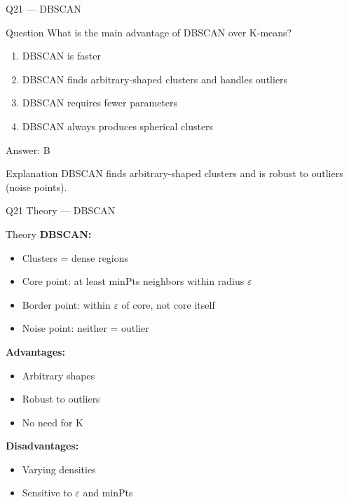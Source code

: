 \documentclass[aspectratio=169,8pt]{beamer}
\begin{document}
	\begin{frame}{Q21 --- DBSCAN}
		\begin{block}{Question}
			What is the main advantage of DBSCAN over K-means?
		\end{block}
		\begin{enumerate}[label=\Alph*.]
			\item DBSCAN is faster
			\item DBSCAN finds arbitrary-shaped clusters and handles outliers
			\item DBSCAN requires fewer parameters
			\item DBSCAN always produces spherical clusters
		\end{enumerate}
		\begin{exampleblock}{Answer: B}
		\end{exampleblock}
		\begin{block}{Explanation}
			DBSCAN finds arbitrary-shaped clusters and is robust to outliers (noise points).
		\end{block}
	\end{frame}
	
	\begin{frame}{Q21 Theory --- DBSCAN}
		\begin{block}{Theory}
			\textbf{DBSCAN:}
			\begin{itemize}
				\item Clusters = dense regions
				\item Core point: at least minPts neighbors within radius $\varepsilon$
				\item Border point: within $\varepsilon$ of core, not core itself
				\item Noise point: neither = outlier
			\end{itemize}
			\textbf{Advantages:}
			\begin{itemize}
				\item Arbitrary shapes
				\item Robust to outliers
				\item No need for K
			\end{itemize}
			\textbf{Disadvantages:}
			\begin{itemize}
				\item Varying densities
				\item Sensitive to $\varepsilon$ and minPts
			\end{itemize}
		\end{block}
	\end{frame}
	
\end{document}
